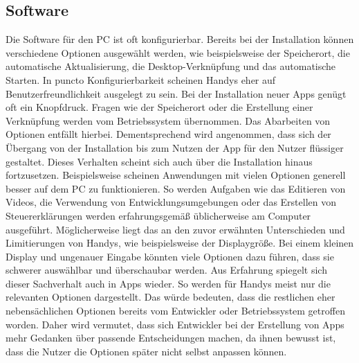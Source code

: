\subsection{Software}
Die Software für den PC ist oft konfigurierbar. %
	Bereits bei der Installation können verschiedene Optionen ausgewählt werden, wie beispielsweise der Speicherort, die automatische Aktualisierung, die Desktop-Verknüpfung und das automatische Starten.\newline%
In puncto Konfigurierbarkeit scheinen Handys eher auf Benutzerfreundlichkeit ausgelegt zu sein. %
	Bei der Installation neuer Apps genügt oft ein Knopfdruck. Fragen wie der Speicherort oder die Erstellung einer Verknüpfung werden vom Betriebssystem übernommen. Das Abarbeiten von Optionen entfällt hierbei. Dementsprechend wird angenommen, dass sich der Übergang von der Installation bis zum Nutzen der App für den Nutzer flüssiger gestaltet.\newline%
Dieses Verhalten scheint sich auch über die Installation hinaus fortzusetzen. Beispielsweise scheinen Anwendungen mit vielen Optionen generell besser auf dem PC zu funktionieren. %
	So werden Aufgaben wie das Editieren von Videos, die Verwendung von Entwicklungsumgebungen oder das Erstellen von Steuererklärungen werden erfahrungsgemäß üblicherweise am Computer ausgeführt. %
		Möglicherweise liegt das an den zuvor erwähnten Unterschieden und Limitierungen von Handys, wie beispielsweise der Displaygröße. Bei einem kleinen Display und ungenauer Eingabe könnten viele Optionen dazu führen, dass sie schwerer auswählbar und überschaubar werden.\newline%
Aus Erfahrung spiegelt sich dieser Sachverhalt auch in Apps wieder. So werden für Handys meist nur die relevanten Optionen dargestellt. Das würde bedeuten, dass die restlichen eher nebensächlichen Optionen bereits vom Entwickler oder Betriebssystem getroffen worden.\newline%
	Daher wird vermutet, dass sich Entwickler bei der Erstellung von Apps mehr Gedanken über passende Entscheidungen machen, da ihnen bewusst ist, dass die Nutzer die Optionen später nicht selbst anpassen können.\newline%
